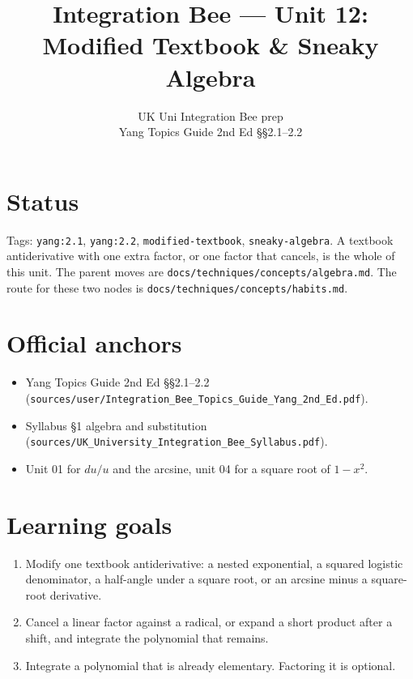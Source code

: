 
\title{Integration Bee --- Unit 12:\\ Modified Textbook \& Sneaky Algebra}
\author{UK Uni Integration Bee prep\\ Yang Topics Guide 2nd Ed §§2.1--2.2}
\date{}

\maketitle

\section*{Status}
Tags: \texttt{yang:2.1}, \texttt{yang:2.2}, \texttt{modified-textbook}, \texttt{sneaky-algebra}.
A textbook antiderivative with one extra factor, or one factor that cancels, is the whole of this unit. The parent moves are \texttt{docs/techniques/concepts/algebra.md}. The route for these two nodes is \texttt{docs/techniques/concepts/habits.md}.

\section{Official anchors}
\begin{itemize}
  \item Yang Topics Guide 2nd Ed §§2.1--2.2
        (\texttt{sources/user/Integration\_Bee\_Topics\_Guide\_Yang\_2nd\_Ed.pdf}).
  \item Syllabus §1 algebra and substitution
        (\texttt{sources/UK\_University\_Integration\_Bee\_Syllabus.pdf}).
  \item Unit 01 for $du/u$ and the arcsine, unit 04 for a square root of $1-x^2$.
\end{itemize}

\section{Learning goals}
\begin{enumerate}
  \item Modify one textbook antiderivative: a nested exponential, a squared logistic denominator, a half-angle under a square root, or an arcsine minus a square-root derivative.
  \item Cancel a linear factor against a radical, or expand a short product after a shift, and integrate the polynomial that remains.
  \item Integrate a polynomial that is already elementary. Factoring it is optional.
\end{enumerate}

